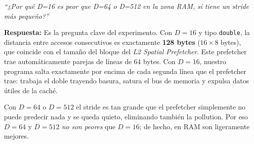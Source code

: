 \documentclass[12pt,a4paper]{article}
\begin{document}
\begin{tcolorbox}[trampa, title={Pregunta Trampa 5 --- ¿Por qué D=16 es peor que D=64?}]
\textit{``¿Por qué D=16 es peor que D=64 o D=512 en la zona RAM, si tiene un stride más pequeño?''}

\vspace{6pt}
\textbf{Respuesta:} Es la pregunta clave del experimento. Con $D=16$ y tipo \texttt{double}, la distancia entre accesos consecutivos es exactamente \textbf{128 bytes} ($16 \times 8$ bytes), que coincide con el tamaño del bloque del \emph{L2 Spatial Prefetcher}. Este prefetcher trae automáticamente parejas de líneas de 64 bytes. Con $D=16$, nuestro programa salta exactamente por encima de cada segunda línea que el prefetcher trae: trabaja el doble trayendo basura, satura el bus de memoria y expulsa datos útiles de la caché.

Con $D=64$ o $D=512$ el stride es tan grande que el prefetcher simplemente no puede predecir nada y se queda quieto, eliminando también la pollution. Por eso $D=64$ y $D=512$ \emph{no son peores} que $D=16$; de hecho, en RAM son ligeramente mejores.
\end{tcolorbox}
\end{document}
